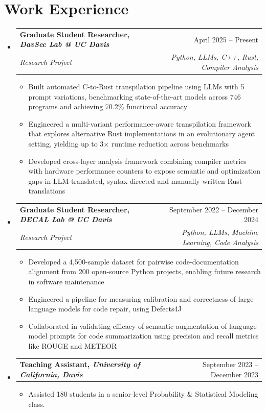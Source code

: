 \documentclass[letterpaper,10pt]{article}
\makeatletter
\newcommand{\resumeItem}[1]{\item\small{#1} \vspace{-3pt}}
\newcommand{\resumeSubheading}[4]{%
  \vspace{-1pt}\item
  \begin{tabular*}{0.97\textwidth}[t]{l@{\extracolsep{\fill}}r}
    \textbf{#1} & #2 \\
    \textit{#3} & \textit{#4} \\
  \end{tabular*}\vspace{-7pt}}
\newcommand{\resumeSubheadingSmall}[2]{%
  \vspace{-1pt}\item
  \begin{tabular*}{0.97\textwidth}[t]{l@{\extracolsep{\fill}}r}
    \textbf{#1} & #2 \\
  \end{tabular*}\vspace{-7pt}}
\newcommand{\resumeSubHeadingList}{\begin{itemize}[leftmargin=0.15in, label={}, labelsep=0.15in]}
\newcommand{\resumeJustifiedList}{\begin{itemize}[leftmargin=0.3in, label=\textbullet, labelsep=0.1in]}
\newcommand{\resumeSubHeadingListEnd}{\end{itemize}}
\makeatother
\begin{document}
\section{Work Experience}
{\normalsize
\resumeSubHeadingList
  \resumeSubheading{Graduate Student Researcher, \textit{DavSec Lab @ UC Davis}}{April 2025 -- Present}{Research Project}{Python, LLMs, C++, Rust, Compiler Analysis}
  \resumeJustifiedList
    \resumeItem{Built automated C-to-Rust transpilation pipeline using LLMs with 5 prompt variations, benchmarking state-of-the-art models across 746 programs and achieving 70.2\% functional accuracy}
    \resumeItem{Engineered a multi-variant performance-aware transpilation framework that explores alternative Rust implementations in an evolutionary agent setting, yielding up to 3$\times$ runtime reduction across benchmarks}
    \resumeItem{Developed cross-layer analysis framework combining compiler metrics with hardware performance counters to expose semantic and optimization gaps in LLM-translated, syntax-directed and manually-written Rust translations}
  \end{itemize}
  \resumeSubheading{Graduate Student Researcher, \textit{DECAL Lab @ UC Davis}}{September 2022 -- December 2024}{Research Project}{Python, LLMs, Machine Learning, Code Analysis}
  \resumeJustifiedList
    \resumeItem{Developed a 4,500-sample dataset for pairwise code-documentation alignment from 200 open-source Python projects, enabling future research in software maintenance}
    \resumeItem{Engineered a pipeline for measuring calibration and correctness of large language models for code repair, using Defects4J}
    \resumeItem{Collaborated in validating efficacy of semantic augmentation of language model prompts for code summarization using precision and recall metrics like ROUGE and METEOR}
  \end{itemize}
  \resumeSubheadingSmall{Teaching Assistant, \textit{University of California, Davis}}{September 2023 -- December 2023}
  \resumeJustifiedList
    \resumeItem{Assisted 180 students in a senior-level Probability \& Statistical Modeling class.}
  \end{itemize}
\resumeSubHeadingListEnd
}
\end{document}
